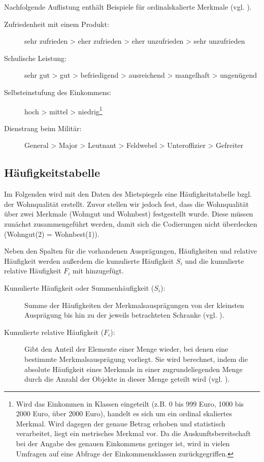 Nachfolgende Auflistung enthält Beispiele für ordinalskalierte Merkmale (vgl. ).
\begin{description}
  \item[Zufriedenheit mit einem Produkt:] sehr zufrieden > eher zufrieden > eher unzufrieden > sehr unzufrieden
  \item[Schulische Leistung:] sehr gut > gut > befriedigend > ausreichend > mangelhaft > ungenügend
  \item[Selbsteinstufung des Einkommens:] hoch > mittel > niedrig\footnote{Wird das Einkommen in
  Klassen eingeteilt (z.B. 0 bis 999 Euro, 1000 bis 2000 Euro, über 2000 Euro), 
  handelt es sich um ein ordinal skaliertes Merkmal. Wird dagegen der genaue Betrag erhoben und statistisch verarbeitet, liegt ein metrisches Merkmal vor. 
  Da die Auskunftsbereitschaft bei der Angabe des genauen Einkommens geringer ist, wird in vielen
  Umfragen auf eine Abfrage der Einkommensklassen zurückgegriffen.}
  \item[Dienstrang beim Militär:] General > Major > Leutnant > Feldwebel > Unteroffizier > Gefreiter
\end{description} 




\subsection{Häufigkeitstabelle}
Im Folgenden wird mit den Daten des Mietspiegels eine Häufigkeitstabelle bzgl. der Wohnqualität
erstellt. Zuvor stellen wir jedoch fest, dass die Wohnqualität über zwei Merkmale (Wohngut und
Wohnbest) festgestellt wurde. Diese müssen zunächst zusammengeführt werden, damit sich die Codierungen nicht
überdecken (Wohngut(2) = Wohnbest(1)). 

Neben den Spalten für die vorhandenen Ausprägungen, Häufigkeiten und relative Häufigkeit werden außerdem die kumulierte Häufigkeit $S_i$ und die kumulierte relative Häufigkeit $F_i$ mit hinzugefügt.
\begin{description}
\item[Kumulierte Häufigkeit oder Summenhäufigkeit ($S_i$):] Summe der Häufigkeiten der Merkmalsausprägungen von der kleinsten Ausprägung bis hin zu der jeweils betrachteten Schranke (vgl. ).
\item[Kumulierte relative Häufigkeit ($F_i$):] Gibt den Anteil der Elemente einer Menge wieder, bei denen eine bestimmte Merkmalsausprägung vorliegt. Sie wird berechnet, indem die absolute Häufigkeit eines Merkmals in einer zugrundeliegenden Menge durch die Anzahl der Objekte in dieser Menge geteilt wird (vgl. ).
\end{description}


